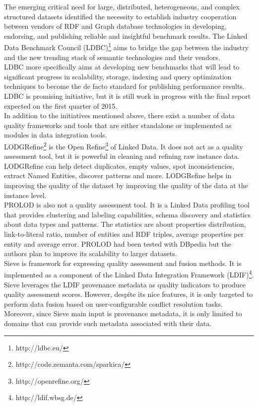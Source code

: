 \documentclass[onecolumn, crcready]{iosart2c}
\begin{document}
The emerging critical need for large, distributed, heterogeneous, and complex structured datasets identified the necessity to establish industry cooperation between vendors of RDF and Graph database technologies in developing, endorsing, and publishing reliable and insightful benchmark results. The Linked Data Benchmark Council (LDBC)\footnote{http://ldbc.eu/} aims to bridge the gap between the industry and the new trending stack of semantic technologies and their vendors. \\ LDBC more specifically aims at developing new benchmarks that will lead to significant progress in scalability, storage, indexing and query optimization techniques to become the de facto standard for publishing performance results. LDBC is promising initiative, but it is still work in progress with the final report expected on the first quarter of 2015.\\

In addition to the initiatives mentioned above, there exist a number of data quality frameworks and tools that are either standalone or implemented as modules in data integration tools. \\

LODGRefine\footnote{http://code.zemanta.com/sparkica/} is the Open Refine\footnote{http://openrefine.org/} of Linked Data. It does not act as a quality assessment tool, but it is powerful in cleaning and refining raw instance data. LODGRefine can help detect duplicates, empty values, spot inconsistencies, extract Named Entities, discover patterns and more. LODGRefine helps in improving the quality of the dataset by improving the quality of the data at the instance level.\\


PROLOD \cite{Bohm2010} is also not a quality assessment tool. It is a Linked Data profiling tool that provides clustering and labeling capabilities, schema discovery and statistics about data types and patterns. The statistics are about properties distribution, link-to-literal ratio, number of entities and RDF triples, average properties per entity and average error. PROLOD had been tested with DBpedia but the authors plan to improve its scalability to larger datasets.\\


Sieve \cite{Mendes2012} is framework for expressing quality assessment and fusion methods. It is implemented as a component of the Linked Data Integration Framework (LDIF)\footnote{http://ldif.wbsg.de/}. Sieve leverages the LDIF provenance metadata as quality indicators to produce quality assessment scores. However, despite its nice features, it is only targeted to perform data fusion based on user-configurable conflict resolution tasks. Moreover, since Sieve main input is provenance metadata, it is only limited to domains that can provide such metadata associated with their data.\\
\end{document}
